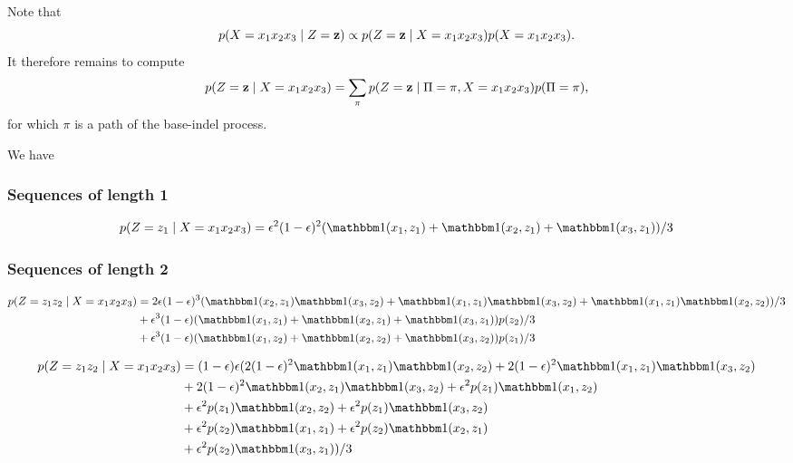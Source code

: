 Note that
\begin{equation*}
  p(X=x_1x_2x_3 \;|\; Z=\mathbf{z}) \propto p(Z=\mathbf{z} \;|\; X=x_1x_2x_3) p(X=x_1x_2x_3).
\end{equation*}
It therefore remains to compute
\begin{equation*}
  p(Z=\mathbf{z} \;|\; X=x_1x_2x_3) = \sum_{\pi}p(Z=\mathbf{z} \;|\; \Pi=\pi, X=x_1x_2x_3) p(\Pi=\pi),
\end{equation*}
for which $\pi$ is a path of the base-indel process.

We have

\subsubsection{Sequences of length 1}

\begin{equation*}
  p(Z=z_1 \gv X=x_1x_2x_3) = \e^2(1-\e)^2(\I(x_1, z_1) + \I(x_2, z_1) + \I(x_3, z_1))/3
\end{equation*}

\subsubsection{Sequences of length 2}

\begin{equation*}
  \begin{split}
    p(Z=z_1z_2 \gv X=x_1x_2x_3)
        &= 2\e(1-\e)^3(\I(x_2, z_1)\I(x_3, z_2) + \I(x_1, z_1)\I(x_3, z_2) + \I(x_1, z_1)\I(x_2, z_2))/3\\
        &+ \e^3(1-\e)(\I(x_1, z_1) + \I(x_2, z_1) + \I(x_3, z_1))p(z_2)/3\\
        &+ \e^3(1-\e)(\I(x_1, z_2) + \I(x_2, z_2) + \I(x_3, z_2))p(z_1)/3
  \end{split}
\end{equation*}

\begin{equation*}
  \begin{split}
    p(Z=z_1z_2 \gv X=x_1x_2x_3)
    &= (1-\e)\e(2(1-\e)^2\I(x_1, z_1)\I(x_2, z_2)
      + 2(1-\e)^2\I(x_1, z_1)\I(x_3, z_2)\\
    &+ 2(1-\e)^2\I(x_2, z_1)\I(x_3, z_2)
      + \e^2p(z_1)\I(x_1, z_2)\\
    &+ \e^2p(z_1)\I(x_2, z_2)
      + \e^2p(z_1)\I(x_3, z_2)\\
    &+ \e^2p(z_2)\I(x_1, z_1)
      + \e^2p(z_2)\I(x_2, z_1)\\
    &+ \e^2p(z_2)\I(x_3, z_1))/3
  \end{split}
\end{equation*}

